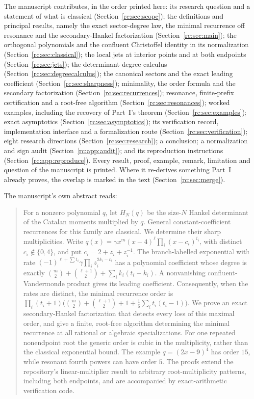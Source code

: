\documentclass[11pt,a4paper]{article}
\numberwithin{equation}{section}
\theoremstyle{definition}
\theoremstyle{remark}
\begin{document}
The manuscript contributes, in the order printed here: its research
question and a statement of what is classical (Section~\ref{rc:sec:scope});
the definitions and principal results, namely the exact sector-degree
law, the minimal recurrence off resonance and the secondary-Hankel
factorization (Section~\ref{rc:sec:main}); the orthogonal polynomials and
the confluent Christoffel identity in its normalization
(Section~\ref{rc:sec:classical}); the local jets at interior points and at
both endpoints (Section~\ref{rc:sec:jets}); the determinant degree calculus
(Section~\ref{rc:sec:degreecalculus}); the canonical sectors and the exact
leading coefficient (Section~\ref{rc:sec:sharpness}); minimality, the order
formula and the secondary factorization (Section~\ref{rc:sec:recurrences});
resonance, finite-prefix certification and a root-free algorithm
(Section~\ref{rc:sec:resonances}); worked examples, including the recovery
of Part~I's theorem (Section~\ref{rc:sec:examples}); exact asymptotics
(Section~\ref{rc:sec:asymptotics}); its verification record, implementation
interface and a formalization route (Section~\ref{rc:sec:verification});
eight research directions (Section~\ref{rc:sec:research}); a conclusion; a
normalization and sign audit (Section~\ref{rc:app:audit}); and its
reproduction instructions (Section~\ref{rc:app:reproduce}).  Every
result, proof, example, remark, limitation and question of the manuscript
is printed.  Where it re-derives something Part~I already proves, the
overlap is marked in the text (Section~\ref{rc:sec:merge}).

The manuscript's own abstract reads:
\begin{quote}\small
For a nonzero polynomial $q$, let $H_N(q)$ be the size-$N$ Hankel
determinant of the Catalan moments multiplied by $q$.  General
constant-coefficient recurrences for this family are classical.  We
determine their sharp multiplicities.  Write
$q(x)=\gamma x^m(x-4)^\ell\prod_i(x-c_i)^{t_i}$, with distinct
$c_i\notin\{0,4\}$, and put $c_i=2+z_i+z_i^{-1}$.
The branch-labelled exponential with rate
$(-1)^{\ell+\sum t_i}\gamma\prod_i z_i^{2k_i-t_i}$ has a polynomial
coefficient whose degree is exactly
$\binom m2+\binom{\ell+1}2+\sum_i k_i(t_i-k_i)$.
A nonvanishing confluent-Vandermonde product gives its leading coefficient.
Consequently, when the rates are distinct, the minimal recurrence order is
$\prod_i(t_i+1)\bigl(\binom m2+\binom{\ell+1}2+1
+\frac16\sum_i t_i(t_i-1)\bigr)$.
We prove an exact secondary-Hankel factorization that detects every loss
of this maximal order, and give a finite, root-free algorithm determining
the minimal recurrence at all rational or algebraic specializations.
For one repeated nonendpoint root the generic order is cubic in the
multiplicity, rather than the classical exponential bound.  The example
$q=(2x-9)^4$ has order $15$, while resonant fourth powers can have order $5$.
The proofs extend the repository's linear-multiplier result to arbitrary
root-multiplicity patterns, including both endpoints, and are accompanied
by exact-arithmetic verification code.
\end{quote}
\end{document}
